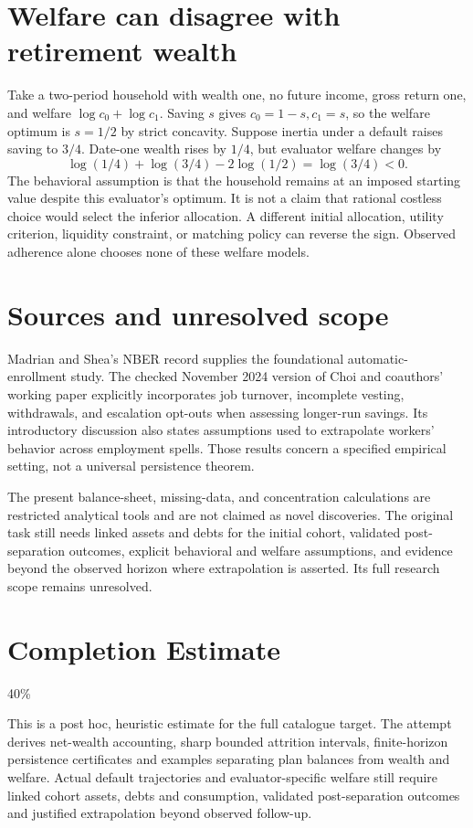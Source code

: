 \documentclass[11pt]{article}
\begin{document}
\section{Welfare can disagree with retirement wealth}
Take a two-period household with wealth one, no future income, gross
return one, and welfare $\log c_0+\log c_1$. Saving $s$ gives
$c_0=1-s,c_1=s$, so the welfare optimum is $s=1/2$ by strict concavity.
Suppose inertia under a default raises saving to $3/4$. Date-one wealth
rises by $1/4$, but evaluator welfare changes by
\[
 \log(1/4)+\log(3/4)-2\log(1/2)=\log(3/4)<0.
\]
The behavioral assumption is that the household remains at an imposed
starting value despite this evaluator's optimum. It is not a claim that
rational costless choice would select the inferior allocation. A different
initial allocation, utility criterion, liquidity constraint, or matching
policy can reverse the sign. Observed adherence alone chooses none of
these welfare models.

\section{Sources and unresolved scope}
Madrian and Shea's NBER record supplies the foundational automatic-
enrollment study. The checked November 2024 version of Choi and coauthors'
working paper explicitly incorporates job turnover, incomplete vesting,
withdrawals, and escalation opt-outs when assessing longer-run savings.
Its introductory discussion also states assumptions used to extrapolate
workers' behavior across employment spells. Those results concern a
specified empirical setting, not a universal persistence theorem.

The present balance-sheet, missing-data, and concentration calculations
are restricted analytical tools and are not claimed as novel discoveries.
The original task still needs linked assets and debts for the initial
cohort, validated post-separation outcomes, explicit behavioral and welfare
assumptions, and evidence beyond the observed horizon where extrapolation
is asserted. Its full research scope remains unresolved.

\section{Completion Estimate}
40\%

This is a post hoc, heuristic estimate for the full catalogue target.
The attempt derives net-wealth accounting, sharp bounded attrition intervals, finite-horizon persistence certificates and examples separating plan balances from wealth and welfare. Actual default trajectories and evaluator-specific welfare still require linked cohort assets, debts and consumption, validated post-separation outcomes and justified extrapolation beyond observed follow-up.
\end{document}
